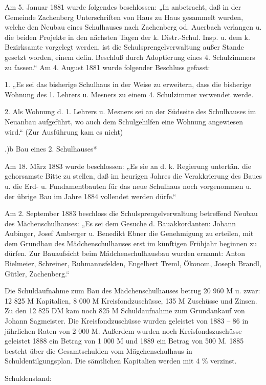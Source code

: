 \documentclass[12pt,a4paper]{book}
\begin{document}
Am 5. Januar 1881 wurde folgendes beschlossen: „In anbetracht, daß in der
Gemeinde Zachenberg Unterschriften von Haus zu Haus gesammelt wurden, welche den
Neubau eines Schulhauses nach Zachenberg od. Auerbach verlangen u. die beiden
Projekte in den nächsten Tagen der k. Distr.-Schul. Insp. u. dem k. Bezirksamte
vorgelegt werden, ist die Schulsprengelverwaltung außer Stande gesetzt worden,
einem defin. Beschluß durch Adoptierung eines 4. Schulzimmers zu fassen.“ Am 4.
August 1881 wurde folgender Beschluss gefasst:



1. „Es sei das bisherige Schulhaus in der Weise zu erweitern, dass die bisherige
Wohnung des 1. Lehrers u. Mesners zu einem 4. Schulzimmer verwendet werde.

2. Als Wohnung d. 1. Lehrers u. Mesners sei an der Südseite des Schulhauses im
Neuanbau aufgeführt, wo auch dem Schulgehilfen eine Wohnung angewiesen wird.“
(Zur Ausführung kam es nicht)

.)b Bau eines 2. Schulhauses*

Am 18. März 1883 wurde beschlossen: „Es sie an d. k. Regierung untertän. die
gehorsamste Bitte zu stellen, daß im heurigen Jahres die Verakkrierung des Baues
u. die Erd- u. Fundamentbauten für das neue Schulhaus noch vorgenommen u. der
übrige Bau im Jahre 1884 vollendet werden dürfe.“

Am 2. September 1883 beschloss die Schulsprengelverwaltung betreffend Neubau des
Mächenschulhauses: „Es sei dem Gesuche d. Bauakkordanten: Johann Aubinger, Josef
Amberger u. Benedikt Ebner die Genehmigung zu erteilen, mit dem Grundbau des
Mädchenschulhauses erst im künftigen Frühjahr beginnen zu dürfen. Zur
Bauaufsicht beim Mädchenschulhausbau wurden ernannt: Anton Bielmeier, Schreiner,
Ruhmannsfelden, Engelbert Treml, Ökonom, Joseph Brandl, Gütler, Zachenberg.“

Die Schuldaufnahme zum Bau des Mädchenschulhauses betrug 20 960 M u. zwar: 12
825 M Kapitalien, 8 000 M Kreisfondzuschüsse, 135 M Zuschüsse und Zinsen. Zu den
12 825 DM kam noch 825 M Schuldaufnahme zum Grundankauf von Johann Sagmeister.
Die Kreisfondzuschüsse wurden geleistet von 1883 – 86 in jährlichen Raten von 2
000 M. Außerdem wurden noch Kreisfondszuschüsse geleistet 1888 ein Betrag von 1
000 M und 1889 ein Betrag von 500 M. 1885 besteht über die Gesamtschulden vom
Mägchenschulhaus in Schuldentilgungsplan. Die sämtlichen Kapitalien werden mit 4
\% verzinst.

Schuldenstand:
\end{document}
